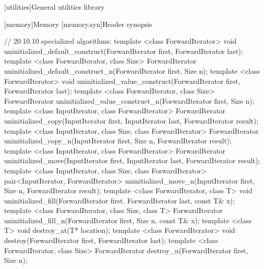 \setcounter{chapter}{19}
[utilities]{General utilities library}

\setcounter{section}{9}
[memory]{Memory}
\setcounter{subsection}{1}
[memory.syn]{Header  synopsis}

{\color{remclr}
\begin{codeblock}
// 20.10.10 specialized algorithms:
template <class ForwardIterator>
  void uninitialized_default_construct(ForwardIterator first, ForwardIterator last);
template <class ForwardIterator, class Size>
  ForwardIterator uninitialized_default_construct_n(ForwardIterator first, Size n);
template <class ForwardIterator>
  void uninitialized_value_construct(ForwardIterator first, ForwardIterator last);
template <class ForwardIterator, class Size>
  ForwardIterator uninitialized_value_construct_n(ForwardIterator first, Size n);
template <class InputIterator, class ForwardIterator>
  ForwardIterator uninitialized_copy(InputIterator first, InputIterator last,
                                     ForwardIterator result);
template <class InputIterator, class Size, class ForwardIterator>
  ForwardIterator uninitialized_copy_n(InputIterator first, Size n,
                                       ForwardIterator result);
template <class InputIterator, class ForwardIterator>
  ForwardIterator uninitialized_move(InputIterator first, InputIterator last,
                                     ForwardIterator result);
template <class InputIterator, class Size, class ForwardIterator>
  pair<InputIterator, ForwardIterator>
    uninitialized_move_n(InputIterator first, Size n, ForwardIterator result);
template <class ForwardIterator, class T>
  void uninitialized_fill(ForwardIterator first, ForwardIterator last,
                          const T& x);
template <class ForwardIterator, class Size, class T>
  ForwardIterator uninitialized_fill_n(ForwardIterator first, Size n, const T& x);
template <class T>
  void destroy_at(T* location);
template <class ForwardIterator>
  void destroy(ForwardIterator first, ForwardIterator last);
template <class ForwardIterator, class Size>
  ForwardIterator destroy_n(ForwardIterator first, Size n);
\end{codeblock}
} %

